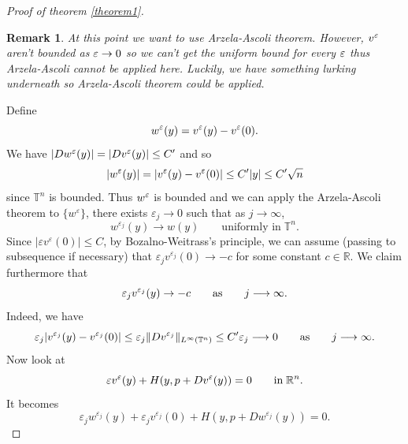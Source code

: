 \documentclass[12pt, oneside]{amsart}  	%
\newtheorem{remark}{Remark}
\begin{document}
\begin{proof}[Proof of theorem \ref{theorem1}]
\begin{remark}
At this point we want to use Arzela-Ascoli theorem. However, $v^\varepsilon$ aren't bounded as $\varepsilon\to0$ so we can't get the uniform bound for every $\varepsilon$ thus Arzela-Ascoli cannot be applied here. Luckily, we have something lurking underneath so Arzela-Ascoli theorem could be applied.
\end{remark}

Define
		$$w^\varepsilon(y)=v^\varepsilon(y)-v^\varepsilon(0).$$
We have $|Dw^\varepsilon(y)| = |Dv^\varepsilon(y)| \le C'$ and so
\begin{equation*}
|w^\varepsilon(y)|= |v^\varepsilon(y)-v^\varepsilon(0)|\le C'|y| \leq C'\sqrt{n}
\end{equation*}
since $\mathbb{T}^n$ is bounded. Thus $w^\varepsilon$ is bounded and we can apply the Arzela-Ascoli theorem to $\{w^\varepsilon\}$, there exists $\varepsilon_j\longrightarrow 0$ such that as $j\longrightarrow\infty$,
\begin{equation}\label{w_uniformly}
w^{\varepsilon_j}(y) \longrightarrow w(y) \qquad\text{uniformly in}\;\mathbb{T}^n.
\end{equation}
Since $|\varepsilon v^\varepsilon(0)| \leq C$, by Bozalno-Weitrass's principle, we can assume (passing to subsequence if necessary) that $\varepsilon_j v^{\varepsilon_j}(0)\longrightarrow -c$ for some constant $c\in \mathbb{R}$. We claim furthermore that
\begin{equation*}
\varepsilon_j v^{\varepsilon_j}(y)\to -c\qquad\text{as}\qquad j\longrightarrow\infty.
\end{equation*}
Indeed, we have
\begin{equation*}
\varepsilon_j|v^{\varepsilon_j}(y)-v^{\varepsilon_j}(0)| \leq \varepsilon_j \Vert Dv^{\varepsilon_j}\Vert_{L^\infty(\mathbb{T}^n)} \leq C'\varepsilon_j \longrightarrow 0 \qquad\text{as}\qquad j\longrightarrow \infty.
\end{equation*}
Now look at
\begin{equation*}
\varepsilon v^\varepsilon(y) + H(y, p+Dv^\varepsilon(y))=0\qquad \text{in}\; \mathbb{R}^n.
\end{equation*}
It becomes
\begin{equation}\label{my_eqn}
\varepsilon_{j}
w^{\varepsilon_{j}}\left(y\right) +
\varepsilon_{j} v^{\varepsilon_{j}}(0) +
H(y,p+ Dw^{\varepsilon_{j}}(y)) = 0.
\end{equation}
\vspace*{0.1cm}


\end{proof}
\end{document}
